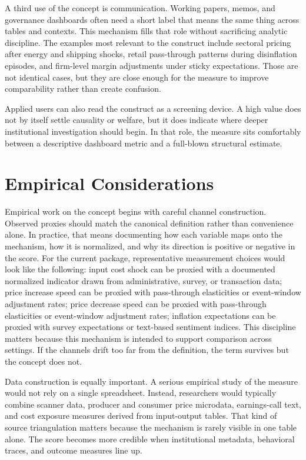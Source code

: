 \documentclass[12pt]{article}
\begin{document}
A third use of the concept is communication. Working papers, memos, and governance dashboards often need a short label that means the same thing across tables and contexts. This mechanism fills that role without sacrificing analytic discipline. The examples most relevant to the construct include sectoral pricing after energy and shipping shocks, retail pass-through patterns during disinflation episodes, and firm-level margin adjustments under sticky expectations. Those are not identical cases, but they are close enough for the measure to improve comparability rather than create confusion.

Applied users can also read the construct as a screening device. A high value does not by itself settle causality or welfare, but it does indicate where deeper institutional investigation should begin. In that role, the measure sits comfortably between a descriptive dashboard metric and a full-blown structural estimate.

\section{Empirical Considerations}
Empirical work on the concept begins with careful channel construction. Observed proxies should match the canonical definition rather than convenience alone. In practice, that means documenting how each variable maps onto the mechanism, how it is normalized, and why its direction is positive or negative in the score. For the current package, representative measurement choices would look like the following: input cost shock can be proxied with a documented normalized indicator drawn from administrative, survey, or transaction data; price increase speed can be proxied with pass-through elasticities or event-window adjustment rates; price decrease speed can be proxied with pass-through elasticities or event-window adjustment rates; inflation expectations can be proxied with survey expectations or text-based sentiment indices. This discipline matters because this mechanism is intended to support comparison across settings. If the channels drift too far from the definition, the term survives but the concept does not.

Data construction is equally important. A serious empirical study of the measure would not rely on a single spreadsheet. Instead, researchers would typically combine scanner data, producer and consumer price microdata, earnings-call text, and cost exposure measures derived from input-output tables. That kind of source triangulation matters because the mechanism is rarely visible in one table alone. The score becomes more credible when institutional metadata, behavioral traces, and outcome measures line up.
\end{document}
